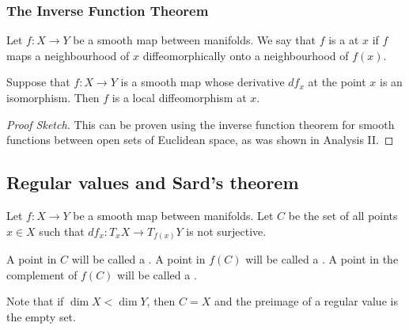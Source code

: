 \documentclass[a4paper, 10pt, twocolumn]{amsart}
\begin{document}
\subsubsection{The Inverse Function Theorem}

Let $f: X \rightarrow Y$ be a smooth map between manifolds. We say that $f$ is a  at $x$ if $f$ maps a neighbourhood of $x$ diffeomorphically onto a neighbourhood of $f(x)$.

\begin{theorem}
    Suppose that $f: X \rightarrow Y$ is a smooth map whose derivative $d f_{x}$ at the point $x$ is an isomorphism. Then $f$ is a local diffeomorphism at $x$.
\end{theorem}
\begin{proof}[Proof Sketch]
    This can be proven using the inverse function theorem for smooth functions between open sets of Euclidean space, as was shown in Analysis II.
\end{proof}


\subsection{Regular values and Sard's theorem}
Let $f: X \rightarrow Y$ be a smooth map between manifolds. Let $C$ be the set of all points $x \in X$ such that $d f_{x}: T_{x} X \rightarrow T_{f(x)} Y$ is not surjective.

\begin{definition}
    A point in $C$ will be called a . A point in $f(C)$ will be called a . A point in the complement of $f(C)$ will be called a .
\end{definition}

\begin{remark}
    Note that if $\operatorname{dim} X<\operatorname{dim} Y$, then $C=X$ and the preimage of a regular value is the empty set.
\end{remark}
\end{document}
